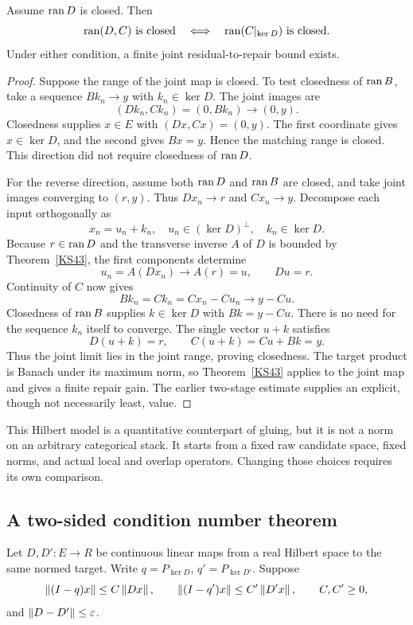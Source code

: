 \begin{theorem}\label{KS47}
Assume \(\operatorname{ran} D\) is closed. Then
\[
 \operatorname{ran}(D,C)\text{ is closed}\quad\Longleftrightarrow\quad
 \operatorname{ran}(C|_{\ker D})\text{ is closed}.
\]
Under either condition, a finite joint residual-to-repair bound exists.
\end{theorem}
\begin{proof}
Suppose the range of the joint map is closed. To test closedness of $\operatorname{ran} B$, take a sequence $Bk_n\to y$ with $k_n\in\ker D$. The joint images are
\[
 (Dk_n,Ck_n)=(0,Bk_n)\longrightarrow(0,y).
\]
Closedness supplies $x\in E$ with $(Dx,Cx)=(0,y)$. The first coordinate gives $x\in\ker D$, and the second gives $Bx=y$. Hence the matching range is closed. This direction did not require closedness of $\operatorname{ran} D$.

For the reverse direction, assume both $\operatorname{ran} D$ and $\operatorname{ran} B$ are closed, and take joint images converging to $(r,y)$. Thus $Dx_n\to r$ and $Cx_n\to y$. Decompose each input orthogonally as
\[
 x_n=u_n+k_n,\quad
 u_n\in(\ker D)^\perp,\quad k_n\in\ker D.
\]
Because $r\in\operatorname{ran} D$ and the transverse inverse $A$ of $D$ is bounded by Theorem~\ref{KS43}, the first components determine
\[
 u_n=A(Dx_n)\longrightarrow A(r)=u,
 \qquad Du=r.
\]
Continuity of $C$ now gives
\[
 Bk_n=Ck_n=Cx_n-Cu_n\longrightarrow y-Cu.
\]
Closedness of $\operatorname{ran} B$ supplies $k\in\ker D$ with $Bk=y-Cu$. There is no need for the sequence $k_n$ itself to converge. The single vector $u+k$ satisfies
\[
 D(u+k)=r,
 \qquad C(u+k)=Cu+Bk=y.
\]
Thus the joint limit lies in the joint range, proving closedness. The target product is Banach under its maximum norm, so Theorem~\ref{KS43} applies to the joint map and gives a finite repair gain. The earlier two-stage estimate supplies an explicit, though not necessarily least, value.
\end{proof}


This Hilbert model is a quantitative counterpart of gluing, but it is not a norm on an arbitrary categorical stack. It starts from a fixed raw candidate space, fixed norms, and actual local and overlap operators. Changing those choices requires its own comparison.

\label{sec:motion}
\subsection{A two-sided condition number theorem}
Let \(D,D':E\to R\) be continuous linear maps from a real Hilbert space to the same normed target. Write \(q=P_{\ker D}\), \(q'=P_{\ker D'}\). Suppose
\[
 \left\lVert(I-q)x\right\rVert\le C\left\lVert Dx\right\rVert,\qquad
 \left\lVert(I-q')x\right\rVert\le C'\left\lVert D'x\right\rVert,\qquad C,C'\ge0,
\]
and \(\left\lVert D-D'\right\rVert\le\varepsilon\).

